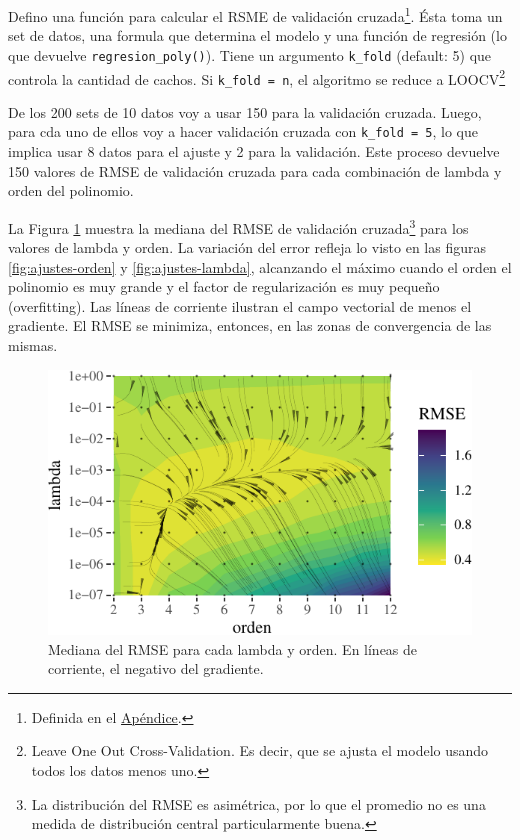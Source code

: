 \documentclass[]{tufte-handout}
\begin{document}
Defino una función para calcular el RSME de validación cruzada\footnote{Definida en el \protect\hyperlink{def-cv}{Apéndice}.}. Ésta toma un set de datos, una formula que determina el modelo y una función de regresión (lo que devuelve \texttt{regresion\_poly()}). Tiene un argumento \texttt{k\_fold} (default: 5) que controla la cantidad de cachos. Si \texttt{k\_fold\ =\ n}, el algoritmo se reduce a LOOCV\footnote{Leave One Out Cross-Validation. Es decir, que se ajusta el modelo usando todos los datos menos uno.}

De los 200 sets de 10 datos voy a usar 150 para la validación cruzada. Luego, para cda uno de ellos voy a hacer validación cruzada con \texttt{k\_fold\ =\ 5}, lo que implica usar 8 datos para el ajuste y 2 para la validación. Este proceso devuelve 150 valores de RMSE de validación cruzada para cada combinación de lambda y orden del polinomio.

La Figura \ref{fig:rmse-campo} muestra la mediana del RMSE de validación cruzada\footnote{La distribución del RMSE es asimétrica, por lo que el promedio no es una medida de distribución central particularmente buena.} para los valores de lambda y orden. La variación del error refleja lo visto en las figuras \ref{fig:ajustes-orden} y \ref{fig:ajustes-lambda}, alcanzando el máximo cuando el orden el polinomio es muy grande y el factor de regularización es muy pequeño (overfitting). Las líneas de corriente ilustran el campo vectorial de menos el gradiente. El RMSE se minimiza, entonces, en las zonas de convergencia de las mismas.

\begin{figure}
\includegraphics{TP-Labo-1_files/figure-latex/rmse-campo-1} \caption[Mediana del RMSE para cada lambda y orden]{Mediana del RMSE para cada lambda y orden. En líneas de corriente, el negativo del gradiente.}\label{fig:rmse-campo}
\end{figure}
\end{document}

